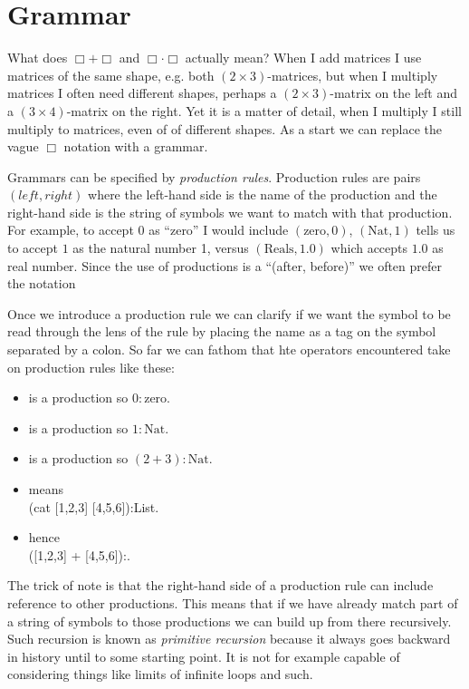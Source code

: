 \section{Grammar}
What does $\Box+\Box$ and $\Box\cdot \Box$ actually mean?  When I add matrices I
use matrices of the same shape, e.g. both $(2\times 3)$-matrices,  but when I
multiply matrices I often need different shapes, perhaps a $(2\times 3)$-matrix
on the left and a $(3\times 4)$-matrix on the right.  Yet it is a matter of
detail, when I multiply I still multiply to matrices, even of of different
shapes. As a start we can replace the vague $\Box$ notation with a grammar.

Grammars can be specified by \emph{production rules}.  Production rules are
pairs $(left,right)$ where the left-hand side is the name of the production and
the right-hand side is the string of symbols we want to match with that
production.  For example, to accept $0$ as ``zero'' I would include
$(\text{zero},0)$, $(\text{Nat},1)$ tells us to accept $1$ as the natural 
number 1, versus $(\text{Reals},1.0)$ which accepts $1.0$ as real number.
Since the use of productions is a ``(after, before)'' we often prefer 
the notation 
\begin{center}
\end{center}
Once we introduce a production rule we can clarify if we want the symbol 
to be read through the lens of the rule by placing the name as a 
tag on the symbol separated by a colon.  So far we can fathom 
that hte operators encountered take on production rules like these:
\begin{itemize}
\item 
     is a production so  $0:\text{zero}$.
\item 
     is a production so  $1:\text{Nat}$.
    \item 
     is a production so  $(2+3):\text{Nat}$.
\item 
     means\\
    (cat [1,2,3] [4,5,6]):List. 
\item 
     hence\\
    ([1,2,3] + [4,5,6]):. 
\end{itemize}
The trick of note is that the right-hand side of a production 
rule can include reference to other productions.  This means 
that if we have already match part of a string of symbols to those 
productions we can build up from there recursively.  Such recursion 
is known as \emph{primitive recursion} because it always goes backward 
in history until to some starting point.  It is not for example 
capable of considering things like limits of infinite loops and such.

